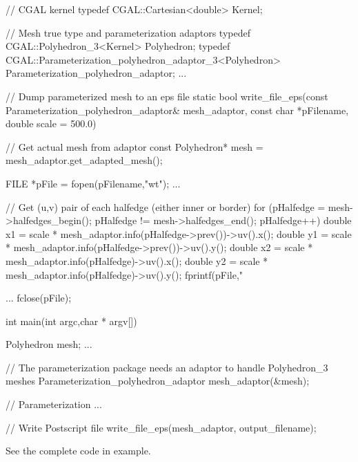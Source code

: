 \begin{ccExampleCode}

// CGAL kernel
typedef CGAL::Cartesian<double>                         Kernel;

// Mesh true type and parameterization adaptors
typedef CGAL::Polyhedron_3<Kernel>                      Polyhedron;
typedef CGAL::Parameterization_polyhedron_adaptor_3<Polyhedron>     
                                                        Parameterization_polyhedron_adaptor;
...

// Dump parameterized mesh to an eps file
static bool write_file_eps(const Parameterization_polyhedron_adaptor& mesh_adaptor,
                           const char *pFilename,
                           double scale = 500.0)
{
    // Get actual mesh from adaptor
    const Polyhedron* mesh = mesh_adaptor.get_adapted_mesh();

    FILE *pFile = fopen(pFilename,"wt");
    ...

    // Get (u,v) pair of each halfedge (either inner or border)
    for (pHalfedge = mesh->halfedges_begin();
         pHalfedge != mesh->halfedges_end();
         pHalfedge++)
    {
        double x1 = scale * mesh_adaptor.info(pHalfedge->prev())->uv().x();
        double y1 = scale * mesh_adaptor.info(pHalfedge->prev())->uv().y();
        double x2 = scale * mesh_adaptor.info(pHalfedge)->uv().x();
        double y2 = scale * mesh_adaptor.info(pHalfedge)->uv().y();
        fprintf(pFile,"%
    }

    ...
    fclose(pFile);
}

int main(int argc,char * argv[])
{
    Polyhedron mesh;
    ...

    // The parameterization package needs an adaptor to handle Polyhedron_3 meshes
    Parameterization_polyhedron_adaptor mesh_adaptor(&mesh);

    // Parameterization
    ...

    // Write Postscript file
    write_file_eps(mesh_adaptor, output_filename);
}

\end{ccExampleCode}

See the complete code in  example.